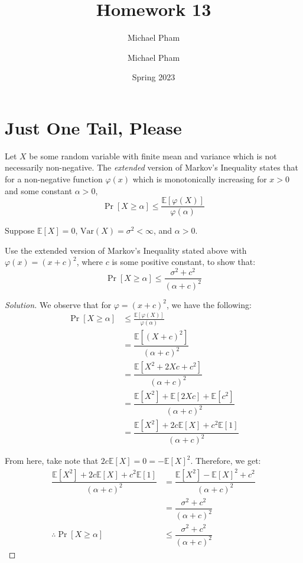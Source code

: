 \documentclass{article}
\title{#1}
\author{Michael Pham}
\date{#2}
\newenvironment{solution}{\begin{proof}[Solution]}{\end{proof}}
\newcommand{\E}{\mathbb{E}}
\newcommand{\var}{\mathrm{Var}}
\newcommand{\mytitle}[2]{%
	\title{#1}
	\author{Michael Pham}
	\date{#2}
	\maketitle
	\newpage
	\tableofcontents
	\newpage
}
\begin{document}
\mytitle{Homework 13}{Spring 2023}

\section{Just One Tail, Please}
Let $X$ be some random variable with finite mean and variance which is not necessarily non-negative.
The \textit{extended} version of Markov's Inequality states that for a non-negative function $\varphi(x)$ which is monotonically increasing for $x > 0$ and some constant $\alpha > 0$,
\[ \Pr\left[X \geq \alpha\right] \leq \frac{\E[\varphi(X)]}{\varphi(\alpha)} \]

Suppose $\E[X] = 0$, $\var(X) = \sigma^2 < \infty$, and $\alpha > 0$. 

\begin{hw}
	Use the extended version of Markov's Inequality stated above with $\varphi(x) = (x+c)^2$, where $c$ is some positive constant, to show that:
	\[ \Pr\left[X \geq \alpha\right] \le \frac{\sigma^2 + c^2}{(\alpha + c)^2} \]
\end{hw}
\begin{solution}
	We observe that for $\varphi = (x+c)^{2}$, we have the following:
	\begin{align*}
		\Pr[X \geq \alpha] &\leq \frac{\E[\varphi(X)]}{\varphi(\alpha)} \\
		&= \dfrac{\E\left[ (X + c)^{2} \right]}{(\alpha + c)^{2}} \\
		&= \dfrac{\E\left[ X^{2} + 2Xc + c^{2} \right]}{(\alpha+ c)^{2}} \\
		&= \dfrac{\E\left[ X^{2} \right] + \E\left[ 2Xc \right] + \E\left[ c^{2} \right]}{(\alpha + c)^{2}} \\
		&= \dfrac{\E[X^{2}] + 2c\E[X] + c^{2}\E[1]}{(\alpha + c)^{2}}
	\end{align*}

	From here, take note that $2c\E[X] = 0 = -\E[X]^{2}$. Therefore, we get:
	\begin{align*}
		\dfrac{\E[X^{2}] + 2c\E[X] + c^{2}\E[1]}{(\alpha + c)^{2}} &= \dfrac{\E[X^{2}] - \E[X]^{2} + c^{2}}{(\alpha + c)^{2}} \\
		&= \dfrac{\sigma^{2} + c^{2}}{(\alpha + c)^{2}} \\
		\therefore \Pr[X \geq \alpha] &\leq \dfrac{\sigma^{2} + c^{2}}{(\alpha + c)^{2}}
	\end{align*}
\end{solution}

\newpage
\end{document}
